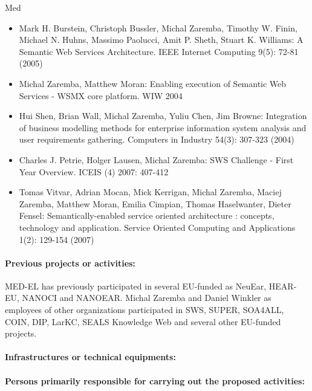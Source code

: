 \begin{sitedescription}{Med}
\begin{itemize}
\item Mark H. Burstein, Christoph Bussler, Michal Zaremba, Timothy W. Finin, Michael N. Huhns, Massimo Paolucci, Amit P. Sheth, Stuart K. Williams:
A Semantic Web Services Architecture. IEEE Internet Computing 9(5): 72-81 (2005)
\item Michal Zaremba, Matthew Moran: Enabling execution of Semantic Web Services - WSMX core platform. WIW 2004
\item Hui Shen, Brian Wall, Michal Zaremba, Yuliu Chen, Jim Browne: Integration of business modelling methods for enterprise information system analysis and user requirements gathering. Computers in Industry 54(3): 307-323 (2004)
\item Charles J. Petrie, Holger Lausen, Michal Zaremba: SWS Challenge - First Year Overview. ICEIS (4) 2007: 407-412
\item Tomas Vitvar, Adrian Mocan, Mick Kerrigan, Michal Zaremba, Maciej Zaremba, Matthew Moran, Emilia Cimpian, Thomas Haselwanter, Dieter Fensel: Semantically-enabled service oriented architecture : concepts, technology and application. Service Oriented Computing and Applications 1(2): 129-154 (2007)
\end{itemize}

\paragraph{Previous projects or activities:}


MED-EL has previously participated in several EU-funded as NeuEar, HEAR-EU, NANOCI and NANOEAR. Michal Zaremba and Daniel Winkler as employees of other organizations participated in SWS, SUPER, SOA4ALL, COIN, DIP, LarKC, SEALS Knowledge Web and several other EU-funded projects.

\paragraph{Infrastructures or technical equipments:}


\paragraph{Persons primarily responsible for carrying out the proposed activities:}


\end{sitedescription}
